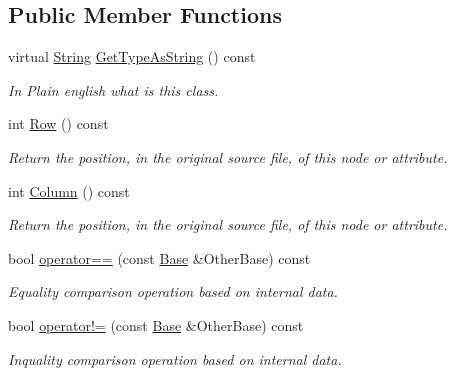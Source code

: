 \subsection*{Public Member Functions}
\begin{DoxyCompactItemize}
\item 
virtual \hyperlink{namespacephys_aa03900411993de7fbfec4789bc1d392e}{String} \hyperlink{classphys_1_1xml_1_1Base_a7ddeb29fad6279b11f6307dd9bd01d3a}{GetTypeAsString} () const 
\begin{DoxyCompactList}\small\item\em In Plain english what is this class. \item\end{DoxyCompactList}\item 
int \hyperlink{classphys_1_1xml_1_1Base_adc2f732f1f37ef7bae5b701a84470754}{Row} () const 
\begin{DoxyCompactList}\small\item\em Return the position, in the original source file, of this node or attribute. \item\end{DoxyCompactList}\item 
int \hyperlink{classphys_1_1xml_1_1Base_a7ef4a2c8165c6bb63f75fdc9f2231948}{Column} () const 
\begin{DoxyCompactList}\small\item\em Return the position, in the original source file, of this node or attribute. \item\end{DoxyCompactList}\item 
bool \hyperlink{classphys_1_1xml_1_1Base_af5412e64fd83a5193e28a20df462b9a6}{operator==} (const \hyperlink{classphys_1_1xml_1_1Base}{Base} \&OtherBase) const 
\begin{DoxyCompactList}\small\item\em Equality comparison operation based on internal data. \item\end{DoxyCompactList}\item 
bool \hyperlink{classphys_1_1xml_1_1Base_a45216237a77d457ceda41f40583f80ac}{operator!=} (const \hyperlink{classphys_1_1xml_1_1Base}{Base} \&OtherBase) const 
\begin{DoxyCompactList}\small\item\em Inquality comparison operation based on internal data. \item\end{DoxyCompactList}\item 

\end{DoxyCompactItemize}
